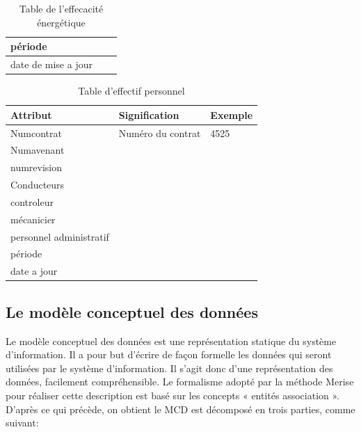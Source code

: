 \documentclass[a4paper]{report}
\begin{document}
\begin{doublespace}
\begin{table}[H]
\begin{center}
\begin{tabularx}{17.5cm}{|X|p{3cm}|p{1.5cm}|}
				\hline
				période                                                        &                        &                  \\
				\hline
				date de mise a jour                                            &                        &                  \\
				\hline
			\end{tabularx}
			\caption{Table de l'effecacité énergétique}
		\end{center}
	\end{table}

	\begin{table}[H]
		\begin{center}
			\begin{tabularx}{17.5cm}{|X|p{3cm}|p{1.5cm}|}
				\hline
				\textbf{Attribut}       & \textbf{Signification} & \textbf{Exemple} \\
				\hline
				Numcontrat              & Numéro du contrat      & 4525             \\
				\hline
				Numavenant              &                        &                  \\
				\hline
				numrevision             &                        &                  \\
				\hline
				Conducteurs             &                        &                  \\
				\hline
				controleur              &                        &                  \\
				\hline
				mécanicier              &                        &                  \\
				\hline
				personnel administratif &                        &                  \\
				\hline
				période                 &                        &                  \\
				\hline
				date a jour             &                        &                  \\
				\hline
			\end{tabularx}
			\caption{Table d'effectif personnel}
		\end{center}
	\end{table}


	\subsection{Le modèle conceptuel des données}
	Le modèle conceptuel des données est une représentation statique du système d’information.
	Il a pour but d’écrire de façon formelle les données qui seront utilisées par le système d’information.
	Il s’agit donc d’une représentation des données, facilement compréhensible.
	Le formalisme adopté par la méthode Merise pour réaliser cette description est basé sur les concepts « entités association ».
	D’après ce qui précède, on obtient le MCD est décomposé en trois parties, comme suivant:

\end{doublespace}
\end{document}
